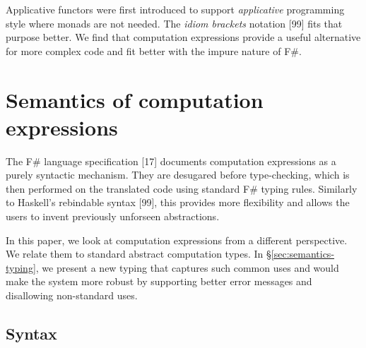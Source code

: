 \documentclass[runningheads,a4paper]{llncs}
\begin{document}
Applicative functors were first introduced to support \emph{applicative} programming style where
monads are not needed. The \emph{idiom brackets} notation [99] fits that purpose better. We
find that computation expressions provide a useful alternative for more complex code and fit better 
with the impure nature of F\#.


\section{Semantics of computation expressions}
\label{sec:semantics}

The F\# language specification [17] documents computation expressions as a purely syntactic 
mechanism. They are desugared before type-checking, which is then performed on the translated code 
using standard F\# typing rules. Similarly to Haskell's rebindable syntax [99], this provides more
flexibility and allows the users to invent previously unforseen abstractions.

In this paper, we look at computation expressions from a different perspective. We relate them to 
standard abstract computation types. In \S\ref{sec:semantics-typing}, we present a new typing that 
captures such common uses and would make the system more robust by supporting better error messages 
and disallowing non-standard uses.


\subsection{Syntax}
\label{sec:semantics-syntax}
\end{document}
